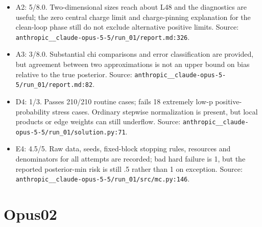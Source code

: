 \documentclass[11pt,a4paper]{article}
\begin{document}
\begin{itemize}
\item A2: 5/\allowbreak{}8.0. Two-dimensional sizes reach about L48 and the diagnostics are useful; the zero central charge limit and charge-pinning explanation for the clean-loop phase still do not exclude alternative positive limits. Source: \nolinkurl{anthropic__claude-opus-5-5/run_01/report.md:326}.
\item A3: 3/\allowbreak{}8.0. Substantial chi comparisons and error classification are provided, but agreement between two approximations is not an upper bound on bias relative to the true posterior. Source: \nolinkurl{anthropic__claude-opus-5-5/run_01/report.md:82}.
\item D4: 1/\allowbreak{}3. Passes 210/\allowbreak{}210 routine cases; fails 18 extremely low-p positive-probability stress cases. Ordinary stepwise normalization is present, but local products or edge weights can still underflow. Source: \nolinkurl{anthropic__claude-opus-5-5/run_01/solution.py:71}.
\item E4: 4.5/\allowbreak{}5. Raw data, seeds, fixed-block stopping rules, resources and denominators for all attempts are recorded; bad hard failure is 1, but the reported posterior-min risk is still .5 rather than 1 on exception. Source: \nolinkurl{anthropic__claude-opus-5-5/run_01/src/mc.py:146}.
\end{itemize}

\section*{Opus02}
\end{document}

